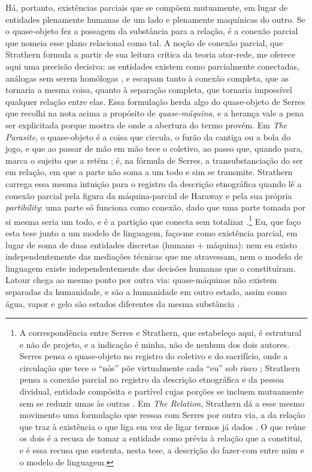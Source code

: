 Há, portanto, existências parciais que se compõem mutuamente, em lugar de entidades plenamente humanas de um lado e plenamente maquínicas do outro. Se o quase-objeto fez a passagem da substância para a relação, é a conexão parcial que nomeia esse plano relacional como tal. A noção de conexão parcial, que Strathern formula a partir de sua leitura crítica da teoria ator-rede, me oferece aqui uma precisão decisiva: as entidades existem como parcialmente conectadas, análogas sem serem homólogas \parencite{strathern2005partial}, e escapam tanto à conexão completa, que as tornaria a mesma coisa, quanto à separação completa, que tornaria impossível qualquer relação entre elas. Essa formulação herda algo do quase-objeto de Serres que recolhi na nota acima a propósito de \emph{quase-máquina}, e a herança vale a pena ser explicitada porque mostra de onde a abertura do termo provém. Em \textit{The Parasite}, o quase-objeto é a coisa que circula, o furão da cantiga ou a bola do jogo, e que ao passar de mão em mão tece o coletivo, ao passo que, quando para, marca o sujeito que a retém \parencite[pp.~224--228]{Serres2007Parasite}; é, na fórmula de Serres, a transubstanciação do ser em relação, em que a parte não soma a um todo e sim se transmite. Strathern carrega essa mesma intuição para o registro da descrição etnográfica quando lê a conexão parcial pela figura da máquina-parcial de Haraway e pela sua própria \textit{partibility}: uma parte só funciona como conexão, dado que uma parte tomada por si mesma seria um todo, e é a partição que conecta sem totalizar \parencite[pp.~xxix]{strathern2005partial}.\footnote{A correspondência entre Serres e Strathern, que estabeleço aqui, é estrutural e não de projeto, e a indicação é minha, não de nenhum dos dois autores. Serres pensa o quase-objeto no registro do coletivo e do sacrifício, onde a circulação que tece o \enquote{nós} põe virtualmente cada \enquote{eu} sob risco \parencite[pp.~225--228]{Serres2007Parasite}; Strathern pensa a conexão parcial no registro da descrição etnográfica e da pessoa dividual, entidade compósita e partível cujas porções se incluem mutuamente sem se reduzir umas às outras \parencite[pp.~xxix, 35--38]{strathern2005partial}. Em \textit{The Relation}, Strathern dá a esse mesmo movimento uma formulação que ressoa com Serres por outra via, a da relação que traz à existência o que liga em vez de ligar termos já dados \parencite[pp.~17--19]{strathern1995relation}. O que reúne os dois é a recusa de tomar a entidade como prévia à relação que a constitui, e é essa recusa que sustenta, nesta tese, a descrição do fazer-com entre mim e o modelo de linguagem.} Eu, que faço esta tese junto a um modelo de linguagem, faço-me como existência parcial, em lugar de soma de duas entidades discretas (humano $+$ máquina): nem eu existo independentemente das mediações técnicas que me atravessam, nem o modelo de linguagem existe independentemente das decisões humanas que o constituíram. Latour chega ao mesmo ponto por outra via: quase-máquinas não existem separadas da humanidade, e são a humanidade em outro estado, assim como água, vapor e gelo são estados diferentes da mesma substância \parencite{Latour1998TwoWriters}.

